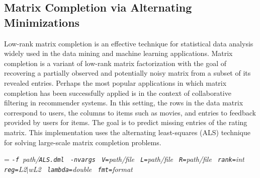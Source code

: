 \begin{comment}

 Licensed to the Apache Software Foundation (ASF) under one
 or more contributor license agreements.  See the NOTICE file
 distributed with this work for additional information
 regarding copyright ownership.  The ASF licenses this file
 to you under the Apache License, Version 2.0 (the
 "License"); you may not use this file except in compliance
 with the License.  You may obtain a copy of the License at

   http://www.apache.org/licenses/LICENSE-2.0

 Unless required by applicable law or agreed to in writing,
 software distributed under the License is distributed on an
 "AS IS" BASIS, WITHOUT WARRANTIES OR CONDITIONS OF ANY
 KIND, either express or implied.  See the License for the
 specific language governing permissions and limitations
 under the License.

\end{comment}

\subsection{Matrix Completion via Alternating Minimizations}
\label{matrix_completion}

\smallskip

Low-rank matrix completion is an effective technique for statistical data analysis widely used in the data mining and machine learning applications.
Matrix completion is a variant of low-rank matrix factorization with the goal of recovering a partially observed and potentially noisy matrix from a subset of its revealed entries.
Perhaps the most popular applications in which matrix completion has been successfully applied is in the context of collaborative filtering in recommender systems. 
In this setting, the rows in the data matrix correspond to users, 
the columns to items such as movies, and entries to feedback provided by users for items. 
The goal is to predict missing entries of the rating matrix. 
This implementation uses the alternating least-squares (ALS) technique for solving large-scale matrix completion problems.\\ 


\smallskip
{}
\smallskip

{\hangindent=\parindent\noindent\it%
	{\tt{}-f }path/\/{\tt{}ALS.dml}
	{\tt{} -nvargs}
	{\tt{} V=}path/file
	{\tt{} L=}path/file
	{\tt{} R=}path/file
	{\tt{} rank=}int
	{\tt{} reg=}L2$\mid$wL2%
	{\tt{} lambda=}double
	{\tt{} fmt=}format
	
}


